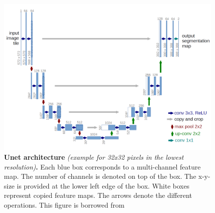 \begin{figure}
\centerline{
\includegraphics[width=\textwidth]{figures/130_methods/unet_nocaption.pdf}
}
\caption{\textbf{Unet architecture} \textit{(example for 32x32 pixels in the lowest resolution)}\textbf{.}
    Each blue box corresponds to a multi-channel feature map. The number of channels is denoted on top of the box. The x-y-size is provided at the lower left edge of the box. White
    boxes represent copied feature maps. The arrows denote the different operations.
    This figure is borrowed from \protect {}
} \label{fig:unet_architecture}
\end{figure}